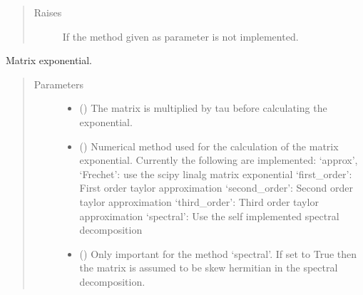 \documentclass[letterpaper,10pt,english]{sphinxmanual}
\begin{document}
\begin{fulllineitems}
\begin{fulllineitems}
\begin{quote}
\begin{description}
\begin{itemize}
\end{itemize}


\item[{Raises}] \leavevmode
{} \textendash{} If the method given as parameter is not implemented.

\end{description}\end{quote}

\end{fulllineitems}


\begin{fulllineitems}
\label{\detokenize{qsim:qsim.matrix.DenseOperator.exp}}
Matrix exponential.
\begin{quote}\begin{description}
\item[{Parameters}] \leavevmode\begin{itemize}
\item {} 
 () \textendash{} The matrix is multiplied by tau before calculating the exponential.

\item {} 
 () \textendash{} Numerical method used for the calculation of the matrix
exponential.
Currently the following are implemented:
\sphinxhyphen{} ‘approx’, ‘Frechet’: use the scipy linalg matrix exponential
\sphinxhyphen{} ‘first\_order’: First order taylor approximation
\sphinxhyphen{} ‘second\_order’: Second order taylor approximation
\sphinxhyphen{} ‘third\_order’: Third order taylor approximation
\sphinxhyphen{} ‘spectral’: Use the self implemented spectral decomposition

\item {} 
 () \textendash{} Only important for the method ‘spectral’. If set to True then the
matrix is assumed to be skew hermitian in the spectral
decomposition.


\end{itemize}
\end{description}
\end{quote}
\end{fulllineitems}
\end{fulllineitems}
\end{document}
